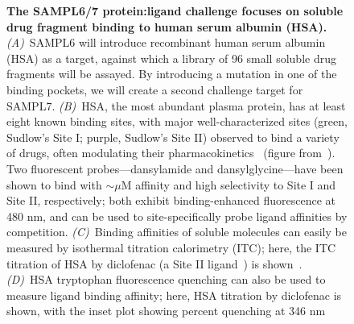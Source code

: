 \documentclass[11pt]{article}
\begin{document}
\begin{figure}[h]
\begin{centering}

\end{centering}
\vspace{0.1in}
\caption{\footnotesize {\bf The SAMPL6/7 protein:ligand challenge focuses on soluble drug fragment binding to human serum albumin (HSA).}
\emph{(A)}~SAMPL6 will introduce recombinant human serum albumin (HSA) as a target, against which a library of 96 small soluble drug fragments will be assayed.
By introducing a mutation in one of the binding pockets, we will create a second challenge target for SAMPL7.
\emph{(B)}~HSA, the most abundant plasma protein, has at least eight known binding sites, with major well-characterized sites (green, Sudlow's Site I; purple, Sudlow's Site II) observed to bind a variety of drugs, often modulating their pharmacokinetics~\cite{Fasano:2005:IUBMBLife(InternationalUnionofBiochemistryandMolecularBiology:Life)} (figure from~\cite{Hall:2013:JournalofChemicalInformationandModeling}).
Two fluorescent probes---dansylamide and dansylglycine---have been shown to bind with $\sim$$\mu$M affinity and high selectivity to Site I and Site II, respectively; both exhibit binding-enhanced fluorescence at 480 nm, and can be used to site-specifically probe ligand affinities by competition.
\emph{(C)}~Binding affinities of soluble molecules can easily be measured by isothermal titration calorimetry (ITC); here, the ITC titration of HSA by diclofenac (a Site II ligand~\cite{Rafols:2014:Talanta}) is shown~\cite{Bou-Abdallah:2016:TheJournalofChemicalThermodynamics}. 
\emph{(D)}~HSA tryptophan fluorescence quenching can also be used to measure ligand binding affinity; here, HSA titration by diclofenac is shown, with the inset plot showing percent quenching at 346 nm~\cite{Bou-Abdallah:2016:TheJournalofChemicalThermodynamics}
\label{figure:hsa-challenge}}
\end{figure}
\end{document}
